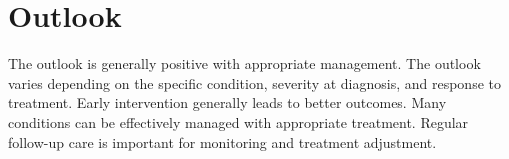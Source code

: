 \section{Outlook}
The outlook is generally positive with appropriate management. The outlook varies depending on the specific condition, severity at diagnosis, and response to treatment. Early intervention generally leads to better outcomes. Many conditions can be effectively managed with appropriate treatment. Regular follow-up care is important for monitoring and treatment adjustment.
